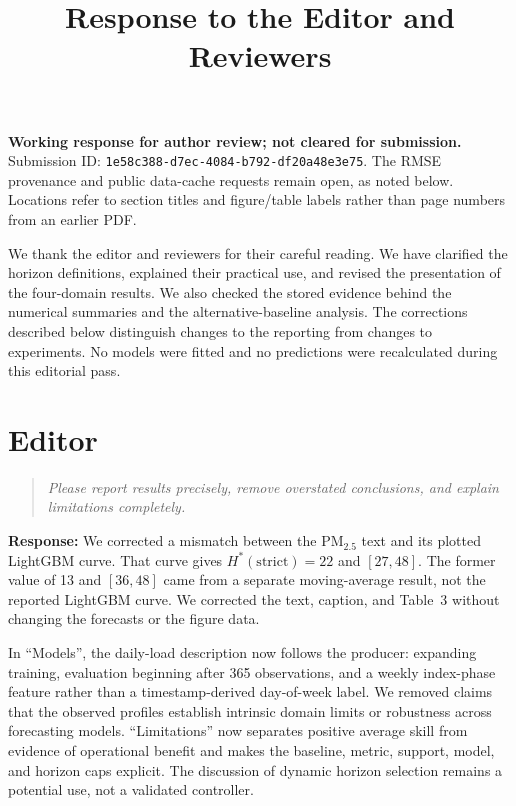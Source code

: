 \documentclass[11pt,a4paper]{article}
\title{\textbf{Response to the Editor and Reviewers}}
\author{}
\date{}
\let\originalsection\section
\renewcommand{\section}{\Needspace{12\baselineskip}\originalsection}
\newenvironment{reviewcomment}
  {\begin{quote}\itshape}
  {\end{quote}}
\newcommand{\response}{\noindent\textbf{Response:} }
\begin{document}
\maketitle
\textbf{Working response for author review; not cleared for submission.}
Submission ID: \texttt{1e58c388-d7ec-4084-b792-df20a48e3e75}.
The RMSE provenance and public data-cache requests remain open, as noted
below. Locations refer to section titles and figure/table labels rather
than page numbers from an earlier PDF.

We thank the editor and reviewers for their careful reading. We have
clarified the horizon definitions, explained their practical use, and
revised the presentation of the four-domain results. We also checked the
stored evidence behind the numerical summaries and the alternative-baseline
analysis. The corrections described below distinguish changes to the
reporting from changes to experiments. No models were fitted and no
predictions were recalculated during this editorial pass.


\section*{Editor}

\begin{reviewcomment}
Please report results precisely, remove overstated conclusions, and explain
limitations completely.
\end{reviewcomment}

\response
We corrected a mismatch between the PM$_{2.5}$ text and its plotted
LightGBM curve. That curve gives $H^*(\mathrm{strict})=22$ and $[27,48]$.
The former value of 13 and $[36,48]$ came from a separate moving-average
result, not the reported LightGBM curve. We corrected the text, caption,
and Table~3 without changing the forecasts or the figure data.

In ``Models'', the daily-load description now follows the producer:
expanding training, evaluation beginning after 365 observations, and a
weekly index-phase feature rather than a timestamp-derived day-of-week
label. We removed claims that the observed profiles establish intrinsic
domain limits or robustness across forecasting models. ``Limitations''
now separates positive average skill from evidence of operational benefit
and makes the baseline, metric, support, model, and horizon caps explicit.
The discussion of dynamic horizon selection remains a potential use,
not a validated controller.
\end{document}
